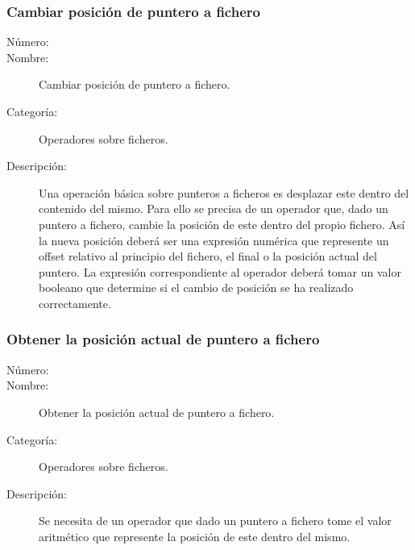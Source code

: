 \subsubsection{Cambiar posición de puntero a fichero}
	\begin{description}
		\item [Número:] \cn
		\item [Nombre:] Cambiar posición de puntero a fichero.
		\item [Categoría:] Operadores sobre ficheros.
		\item [Descripción:] Una operación básica sobre punteros a ficheros es desplazar este dentro del contenido del mismo. 
		Para ello se precisa de un operador que, dado un puntero a fichero, cambie la posición de este dentro del propio fichero.
		Así la nueva posición deberá ser una expresión numérica que represente un offset relativo al principio del fichero, el final 
		o la posición actual del puntero. La expresión correspondiente al operador deberá tomar un valor booleano que determine si el cambio
		de posición se ha realizado correctamente.
	\end{description}

\subsubsection{Obtener la posición actual de puntero a fichero}
	\begin{description}
		\item [Número:] \cn
		\item [Nombre:] Obtener la posición actual de puntero a fichero.
		\item [Categoría:] Operadores sobre ficheros.
		\item [Descripción:] Se necesita de un operador que dado un puntero a fichero tome el valor aritmético que represente la posición de este 
		dentro del mismo.
	\end{description}

